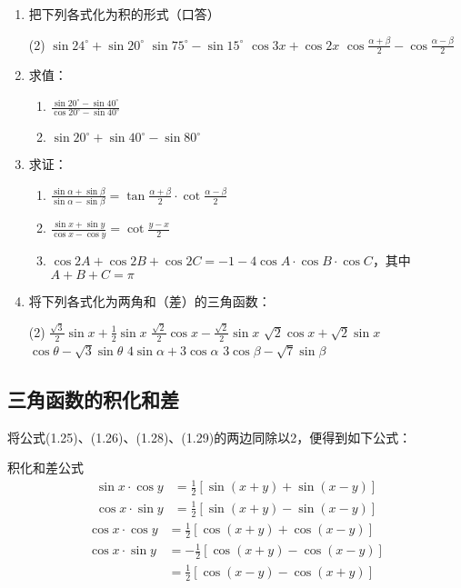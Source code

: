 \begin{ex}
\begin{enumerate}
    \item 把下列各式化为积的形式（口答）
\begin{tasks}(2)
    \task $\sin 24^{\circ}+\sin 20^{\circ}$
    \task $\sin 75^{\circ}-\sin 15^{\circ}$
    \task $\cos 3x+\cos 2x$
    \task $\cos\frac{\alpha+\beta}{2}-\cos\frac{\alpha-\beta}{2}$
\end{tasks}

\item 求值：
\begin{enumerate}
    \item $\frac{\sin20^{\circ}-\sin 40^{\circ}}{\cos 20^{\circ}-\sin 40^{\circ}}$
    \item $\sin 20^{\circ}+\sin 40^{\circ}-\sin 80^{\circ}$
\end{enumerate}

\item 求证：
\begin{enumerate}
    \item $\frac{\sin\alpha+\sin\beta}{\sin\alpha-\sin\beta}=\tan\frac{\alpha+\beta}{2}\cdot \cot\frac{\alpha-\beta}{2}$
    \item $\frac{\sin x+\sin y}{\cos x-\cos y}=\cot\frac{y-x}{2}$
    \item $\cos 2A+\cos 2B+\cos 2C=-1-4\cos A\cdot \cos B\cdot \cos C$，其中$A+B+C=\pi$
\end{enumerate}

\item 将下列各式化为两角和（差）的三角函数：
\begin{tasks}(2)
    \task $\frac{\sqrt{3}}{2}\sin x+\frac{1}{2}\sin x$
    \task $\frac{\sqrt{2}}{2}\cos x-\frac{\sqrt{2}}{2}\sin x$
    \task $\sqrt{2}\cos x+\sqrt{2}\sin x$
    \task $\cos\theta-\sqrt{3}\sin\theta$
    \task $4\sin\alpha+3\cos\alpha$
    \task $3\cos\beta-\sqrt{7}\sin\beta$
\end{tasks}
\end{enumerate}
\end{ex}

\subsection{三角函数的积化和差}
将公式(1.25)、(1.26)、(1.28)、(1.29)的两边同除以2，便得到如下公式：

\begin{blk}{积化和差公式}
\begin{align*}
\sin x\cdot\cos y  &= \frac{1}{2} [\sin (x+y) +\sin (x-y)] \tag{V}\\
\cos x\cdot \sin y &=\frac{1}{2}  [\sin (x+y)-\sin (x-y)] \tag{VI} 
\end{align*} 
\begin{align*}
\cos x\cdot\cos y  &= \frac{1}{2} [\cos (x+y) +\cos (x-y)] \tag{VII}\\
\cos x\cdot \sin y &=-\frac{1}{2}  [\cos (x+y)-\cos (x-y)]  \\
&=\frac{1}{2}[\cos (x-y)-\cos (x+y)] \tag{VIII}
\end{align*} 
\end{blk}

